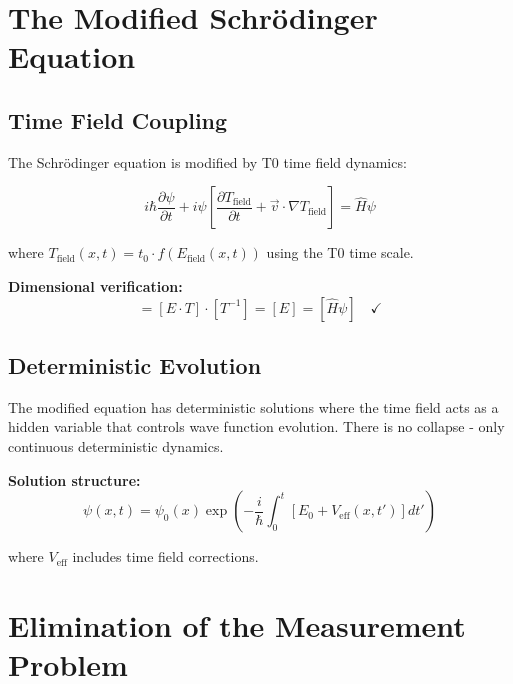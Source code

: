 \documentclass[12pt,a4paper]{report}
\begin{document}
\section{The Modified Schrödinger Equation}
\label{sec:modified_schrodinger}

\subsection{Time Field Coupling}
\label{subsec:time_field_coupling}

The Schrödinger equation is modified by T0 time field dynamics:

\begin{equation}
	\boxed{i \hbar \frac{\partial\psi}{\partial t} + i\psi\left[\frac{\partial T_{\text{field}}}{\partial t} + \vec{v} \cdot \nabla T_{\text{field}}\right] = \hat{H}\psi}
	\label{eq:modified_schrodinger}
\end{equation}

where $T_{\text{field}}(x,t) = t_0 \cdot f(E_{\text{field}}(x,t))$ using the T0 time scale.

\textbf{Dimensional verification:}
\begin{equation}
	[i \hbar \partial_t \psi] = [E \cdot T] \cdot [T^{-1}] = [E] = [\hat{H}\psi] \quad \checkmark
\end{equation}

\subsection{Deterministic Evolution}
\label{subsec:deterministic_evolution}

The modified equation has deterministic solutions where the time field acts as a hidden variable that controls wave function evolution. There is no collapse - only continuous deterministic dynamics.

\textbf{Solution structure:}
\begin{equation}
	\psi(x,t) = \psi_0(x) \exp\left(-\frac{i}{\hbar} \int_0^t \left[E_0 + V_{\text{eff}}(x,t')\right] dt'\right)
\end{equation}

where $V_{\text{eff}}$ includes time field corrections.

\section{Elimination of the Measurement Problem}
\label{sec:measurement_problem}
\end{document}
